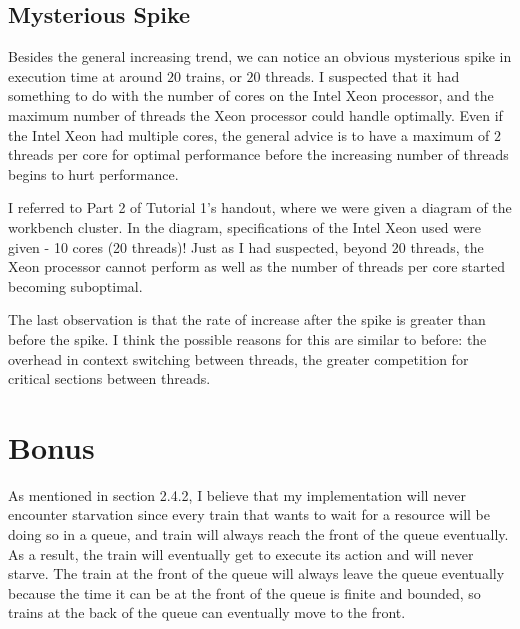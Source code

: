 \documentclass[12pt]{article}
\begin{document}
\subsection{Mysterious Spike}

Besides the general increasing trend, we can notice an obvious mysterious spike in execution time at around $20$ trains, or $20$ threads. I suspected that it had something to do with the number of cores on the Intel Xeon processor, and the maximum number of threads the Xeon processor could handle optimally. Even if the Intel Xeon had multiple cores, the general advice is to have a maximum of $2$ threads per core for optimal performance before the increasing number of threads begins to hurt performance.

\bigbreak \noindent I referred to Part 2 of Tutorial 1's handout, where we were given a diagram of the workbench cluster. In the diagram, specifications of the Intel Xeon used were given - 10 cores (20 threads)! Just as I had suspected, beyond 20 threads, the Xeon processor cannot perform as well as the number of threads per core started becoming suboptimal. 

\bigbreak \noindent The last observation is that the rate of increase after the spike is greater than before the spike. I think the possible reasons for this are similar to before: the overhead in context switching between threads, the greater competition for critical sections between threads.

\section{Bonus}

As mentioned in section 2.4.2, I believe that my implementation will never encounter starvation since every train that wants to wait for a resource will be doing so in a queue, and train will always reach the front of the queue eventually. As a result, the train will eventually get to execute its action and will never starve. The train at the front of the queue will always leave the queue eventually because the time it can be at the front of the queue is finite and bounded, so trains at the back of the queue can eventually move to the front.
\end{document}
